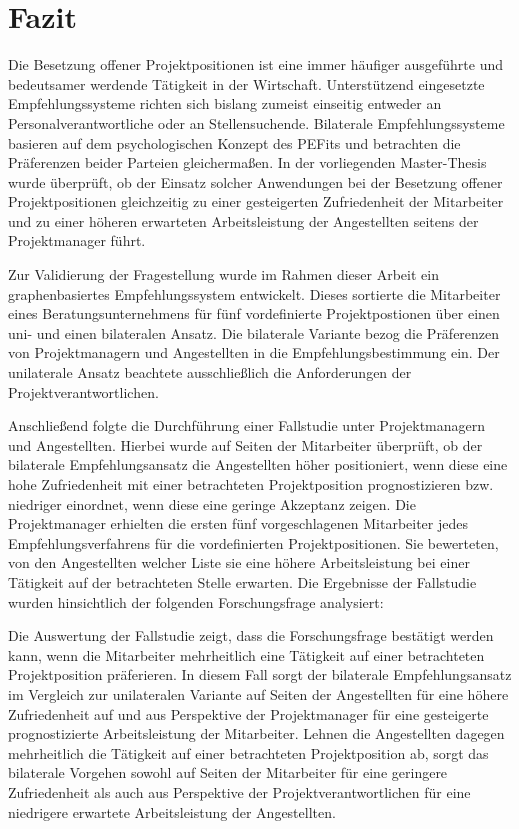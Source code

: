 \chapter{Fazit}
\label{ch:fazit}
Die Besetzung offener Projektpositionen ist eine immer häufiger ausgeführte und bedeutsamer werdende Tätigkeit in der Wirtschaft. Unterstützend eingesetzte Empfehlungssysteme richten sich bislang zumeist einseitig entweder an Personalverantwortliche oder an Stellensuchende. Bilaterale Empfehlungssysteme basieren auf dem psychologischen Konzept des \aclp{PEFit} und betrachten die Präferenzen beider Parteien gleichermaßen. In der vorliegenden Master-Thesis wurde überprüft, ob der Einsatz solcher Anwendungen bei der Besetzung offener Projektpositionen gleichzeitig zu einer gesteigerten Zufriedenheit der Mitarbeiter und zu einer höheren erwarteten Arbeitsleistung der Angestellten seitens der Projektmanager führt. 

Zur Validierung der Fragestellung wurde im Rahmen dieser Arbeit ein graphenbasiertes Empfehlungssystem entwickelt. Dieses sortierte die Mitarbeiter eines Beratungsunternehmens für fünf vordefinierte Projektpostionen über einen uni- und einen bilateralen Ansatz. Die bilaterale Variante bezog die Präferenzen von Projektmanagern und Angestellten in die Empfehlungsbestimmung ein. Der unilaterale Ansatz beachtete ausschließlich die Anforderungen der Projektverantwortlichen.

Anschließend folgte die Durchführung einer Fallstudie unter Projektmanagern und Angestellten. Hierbei wurde auf Seiten der Mitarbeiter überprüft, ob der bilaterale Empfehlungsansatz die Angestellten höher positioniert, wenn diese eine hohe Zufriedenheit mit einer betrachteten Projektposition prognostizieren bzw. niedriger einordnet, wenn diese eine geringe Akzeptanz zeigen. Die Projektmanager erhielten die ersten fünf vorgeschlagenen Mitarbeiter jedes Empfehlungsverfahrens für die vordefinierten Projektpositionen. Sie bewerteten, von den Angestellten welcher Liste sie eine höhere Arbeitsleistung bei einer Tätigkeit auf der betrachteten Stelle erwarten. Die Ergebnisse der Fallstudie wurden hinsichtlich der folgenden Forschungsfrage analysiert: \forschungsfrage

Die Auswertung der Fallstudie zeigt, dass die Forschungsfrage bestätigt werden kann, wenn die Mitarbeiter mehrheitlich eine Tätigkeit auf einer betrachteten Projektposition präferieren. In diesem Fall sorgt der bilaterale Empfehlungsansatz im Vergleich zur unilateralen Variante auf Seiten der Angestellten für eine höhere Zufriedenheit auf und aus Perspektive der Projektmanager für eine gesteigerte prognostizierte Arbeitsleistung der Mitarbeiter. Lehnen die Angestellten dagegen mehrheitlich die Tätigkeit auf einer betrachteten Projektposition ab, sorgt das bilaterale Vorgehen sowohl auf Seiten der Mitarbeiter für eine geringere Zufriedenheit als auch aus Perspektive der Projektverantwortlichen für eine niedrigere erwartete Arbeitsleistung der Angestellten.

